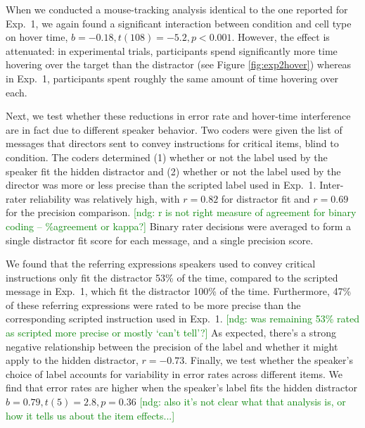 \documentclass[10pt,letterpaper]{article}
\newcommand{\ndg}[1]{\textcolor{Green}{[ndg: #1]}}
\begin{document}

When we conducted a mouse-tracking analysis identical to the one reported for Exp.~1, we again found a significant interaction between condition and cell type on hover time, $b = -0.18, t(108) = -5.2, p < 0.001$. However, the effect is attenuated: in experimental trials, participants spend significantly more time hovering over the target than the distractor (see Figure \ref{fig:exp2hover}) whereas in Exp.~1, participants spent roughly the same amount of time hovering over each.


Next, we test whether these reductions in error rate and hover-time interference are in fact due to different speaker behavior. Two coders were given the list of messages that directors sent to convey instructions for critical items, blind to condition. The coders determined (1) whether or not the label used by the speaker fit the hidden distractor and (2) whether or not the label used by the director was more or less precise than the scripted label used in Exp.~1. Inter-rater reliability was relatively high, with $r=0.82$ for distractor fit and $r=0.69$ for the precision comparison. \ndg{r is not right measure of agreement for binary coding -- \%agreement or kappa?} Binary rater decisions were averaged to form a single distractor fit score for each message, and a single precision score.

We found that the referring expressions speakers used to convey critical instructions only fit the distractor 53\% of the time, compared to the scripted message in Exp.~1, which fit the distractor 100\% of the time. Furthermore, 47\% of these referring expressions were rated to be more precise than the corresponding scripted instruction used in Exp.~1. \ndg{was remaining 53\% rated as scripted more precise or mostly `can't tell'?} As expected, there's a strong negative relationship between the precision of the label and whether it might apply to the hidden distractor, $r = -0.73$. Finally, we test whether the speaker's choice of label accounts for variability in error rates across different items. We find that error rates are higher when the speaker's label fits the hidden distractor $b = 0.79, t(5) = 2.8, p = 0.36$ 
\ndg{also it's not clear what that analysis is, or how it tells us about the item effects...}
\end{document}
